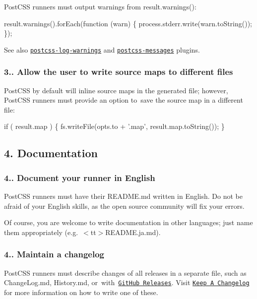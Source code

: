 Post\+C\+SS runners must output warnings from {\ttfamily result.\+warnings()}\+:


\begin{DoxyCode}
result.warnings().forEach(function (warn) \{
    process.stderr.write(warn.toString());
\});
\end{DoxyCode}


See also \href{https://github.com/davidtheclark/postcss-log-warnings}{\tt postcss-\/log-\/warnings} and \href{https://github.com/postcss/postcss-messages}{\tt postcss-\/messages} plugins.

\subsubsection*{3.. Allow the user to write source maps to different files}

Post\+C\+SS by default will inline source maps in the generated file; however, Post\+C\+SS runners must provide an option to save the source map in a different file\+:


\begin{DoxyCode}
if ( result.map ) \{
    fs.writeFile(opts.to + '.map', result.map.toString());
\}
\end{DoxyCode}


\subsection*{4. Documentation}

\subsubsection*{4.. Document your runner in English}

Post\+C\+SS runners must have their {\ttfamily R\+E\+A\+D\+M\+E.\+md} written in English. Do not be afraid of your English skills, as the open source community will fix your errors.

Of course, you are welcome to write documentation in other languages; just name them appropriately (e.\+g.\+ $<$tt$>$R\+E\+A\+D\+M\+E.\+ja.\+md).

\subsubsection*{4.. Maintain a changelog}

Post\+C\+SS runners must describe changes of all releases in a separate file, such as {\ttfamily Change\+Log.\+md}, {\ttfamily History.\+md}, or with \href{https://help.github.com/articles/creating-releases/}{\tt Git\+Hub Releases}. Visit \href{http://keepachangelog.com/}{\tt Keep A Changelog} for more information on how to write one of these.

